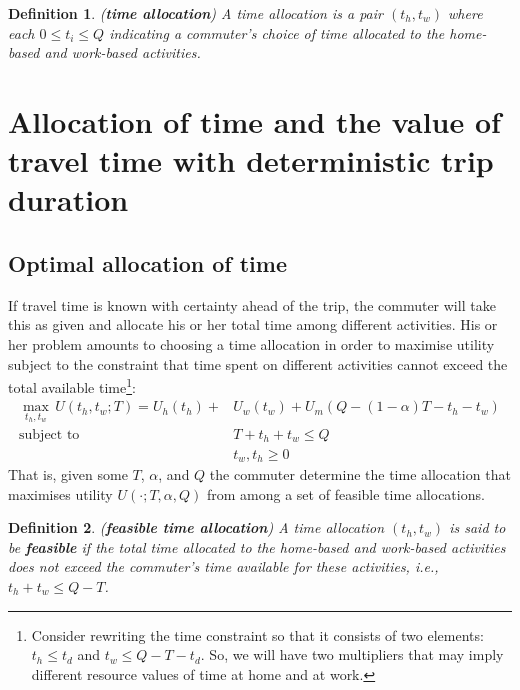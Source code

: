 \documentclass[12pt,a4paper,british]{article}
\newtheorem{definition}{Definition}[section]
\begin{document}
\begin{definition}
(\textbf{time allocation}) A time allocation is a pair $\left(t_{h},t_{w}\right)$ where each $0\leq t_{i}\leq Q$ indicating a commuter's choice of time allocated to the home-based and work-based activities.
\end{definition}


\section{Allocation of time and the value of travel time with deterministic trip duration}

\subsection*{Optimal allocation of time}

If travel time is known with certainty ahead of the trip, the commuter will take this as given and allocate his or her total time among different activities. His or her problem amounts to choosing a time allocation in order to maximise utility subject to the constraint that time spent on different activities cannot exceed the total available time\footnote{Consider rewriting the time constraint so that it consists of two elements: $t_h \leq t_d$ and $t_w \leq Q-T-t_d$. So, we will have two multipliers that may imply different resource values of time at home and at work.}:
\begin{equation}
\begin{aligned}
    \max_{t_{h},t_{w}} \, U\left(t_{h},t_{w};T\right) = U_{h} \left(t_{h}\right) + & U_{w}\left(t_{w}\right) + U_{m}\left( Q - \left(1-\alpha\right) T - t_{h} - t_{w} \right) \\
    \mbox{subject to} \quad & T + t_{h} + t_{w} \leq Q \\
                      \quad & t_w, t_h \geq 0 
\end{aligned}
\label{eq:maxProb_fixedT}
\end{equation}
That is, given some $T$, $\alpha$, and $Q$ the commuter determine the time allocation that maximises utility $U\left( \cdot; T, \alpha, Q \right)$ from among a set of feasible time allocations. 

\begin{definition}
(\textbf{feasible time allocation}) A time allocation $\left( t_h, t_w \right)$ is said to be \textbf{\textit{feasible}} if the total time allocated to the home-based and work-based activities does not exceed the commuter's time available for these activities, i.e., $t_h + t_w \leq Q - T$. 
\end{definition}
\end{document}
